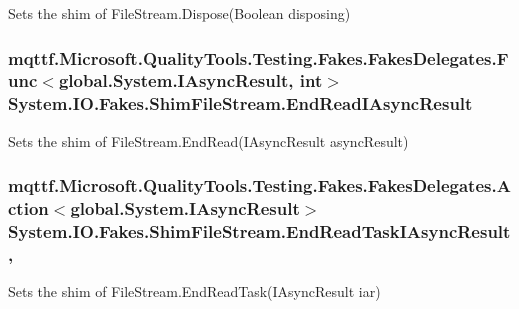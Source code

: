 Sets the shim of File\-Stream.\-Dispose(\-Boolean disposing)

\hypertarget{class_system_1_1_i_o_1_1_fakes_1_1_shim_file_stream_a881a8f04684948bb2071c50fabf15886}{
\subsubsection[{End\-Read\-I\-Async\-Result}]{\setlength{\rightskip}{0pt plus 5cm}mqttf.\-Microsoft.\-Quality\-Tools.\-Testing.\-Fakes.\-Fakes\-Delegates.\-Func$<$global.\-System.\-I\-Async\-Result, int$>$ System.\-I\-O.\-Fakes.\-Shim\-File\-Stream.\-End\-Read\-I\-Async\-Result\hspace{0.3cm}{\ttfamily [set]}}}\label{class_system_1_1_i_o_1_1_fakes_1_1_shim_file_stream_a881a8f04684948bb2071c50fabf15886}


Sets the shim of File\-Stream.\-End\-Read(\-I\-Async\-Result async\-Result)

\hypertarget{class_system_1_1_i_o_1_1_fakes_1_1_shim_file_stream_a999ab07cc6f64a8e58caa150dc6c2efd}{
\subsubsection[{End\-Read\-Task\-I\-Async\-Result}]{\setlength{\rightskip}{0pt plus 5cm}mqttf.\-Microsoft.\-Quality\-Tools.\-Testing.\-Fakes.\-Fakes\-Delegates.\-Action$<$global.\-System.\-I\-Async\-Result$>$ System.\-I\-O.\-Fakes.\-Shim\-File\-Stream.\-End\-Read\-Task\-I\-Async\-Result\hspace{0.3cm}{\ttfamily [static]}, {\ttfamily [set]}}}\label{class_system_1_1_i_o_1_1_fakes_1_1_shim_file_stream_a999ab07cc6f64a8e58caa150dc6c2efd}


Sets the shim of File\-Stream.\-End\-Read\-Task(\-I\-Async\-Result iar)

